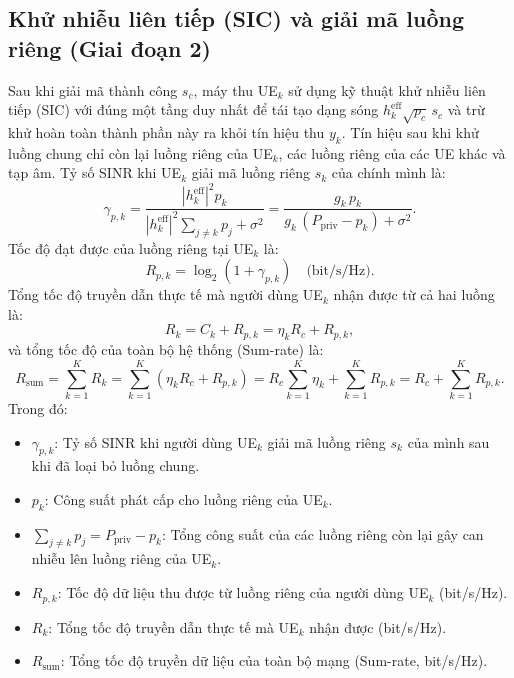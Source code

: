 \subsection{Khử nhiễu liên tiếp (SIC) và giải mã luồng riêng (Giai đoạn 2)}
\label{ssec:sic-giai-ma-rieng}

Sau khi giải mã thành công $s_c$, máy thu UE$_k$ sử dụng kỹ thuật khử nhiễu liên tiếp (SIC) với đúng một tầng
duy nhất để tái tạo dạng sóng $h^{\mathrm{eff}}_k \sqrt{p_c}\, s_c$ và trừ khử hoàn toàn thành phần này ra khỏi
tín hiệu thu $y_k$. Tín hiệu sau khi khử luồng chung chỉ còn lại luồng riêng của UE$_k$, các luồng riêng của
các UE khác và tạp âm. Tỷ số SINR khi UE$_k$ giải mã luồng riêng $s_k$ của chính mình là:
\begin{equation}
\gamma_{p,k} = \frac{|h^{\mathrm{eff}}_k|^2 p_k}{|h^{\mathrm{eff}}_k|^2 \sum_{j \neq k} p_j + \sigma^2}
= \frac{g_k\, p_k}{g_k\,(P_{\mathrm{priv}} - p_k) + \sigma^2} .
\label{eq:sinr-rieng}
\end{equation}
Tốc độ đạt được của luồng riêng tại UE$_k$ là:
\begin{equation}
R_{p,k} = \log_2(1 + \gamma_{p,k}) \quad \text{(bit/s/Hz)}.
\label{eq:toc-do-rieng}
\end{equation}
Tổng tốc độ truyền dẫn thực tế mà người dùng UE$_k$ nhận được từ cả hai luồng là:
\begin{equation}
R_k = C_k + R_{p,k} = \eta_k R_c + R_{p,k},
\label{eq:toc-do-ue}
\end{equation}
và tổng tốc độ của toàn bộ hệ thống (Sum-rate) là:
\begin{equation}
R_{\mathrm{sum}} = \sum_{k=1}^{K} R_k = \sum_{k=1}^{K} (\eta_k R_c + R_{p,k})
= R_c \sum_{k=1}^{K} \eta_k + \sum_{k=1}^{K} R_{p,k} = R_c + \sum_{k=1}^{K} R_{p,k} .
\label{eq:tong-toc-do}
\end{equation}
Trong đó:
\begin{itemize}
\item $\gamma_{p,k}$: Tỷ số SINR khi người dùng UE$_k$ giải mã luồng riêng $s_k$ của mình sau khi đã loại bỏ
  luồng chung.
\item $p_k$: Công suất phát cấp cho luồng riêng của UE$_k$.
\item $\sum_{j \neq k} p_j = P_{\mathrm{priv}} - p_k$: Tổng công suất của các luồng riêng còn lại gây can nhiễu
  lên luồng riêng của UE$_k$.
\item $R_{p,k}$: Tốc độ dữ liệu thu được từ luồng riêng của người dùng UE$_k$ (bit/s/Hz).
\item $R_k$: Tổng tốc độ truyền dẫn thực tế mà UE$_k$ nhận được (bit/s/Hz).
\item $R_{\mathrm{sum}}$: Tổng tốc độ truyền dữ liệu của toàn bộ mạng (Sum-rate, bit/s/Hz).
\end{itemize}

